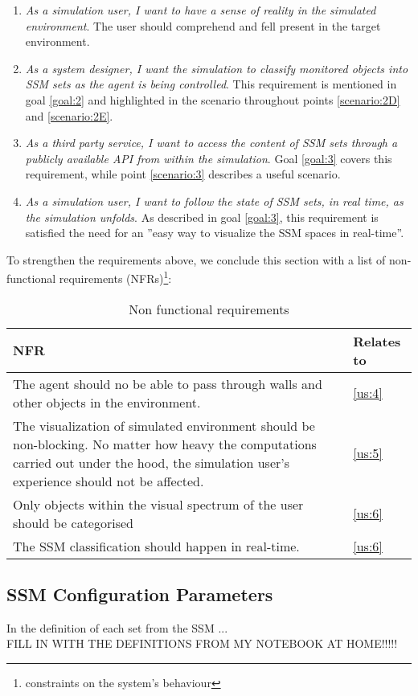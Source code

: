 \begin{enumerate}
	\item[\textlabel{5.}{us:5}] \emph{As a simulation user, I want to have a sense of reality in the simulated environment}. The user should comprehend and fell present in the target environment.

	\item[\textlabel{6.}{us:6}] \emph{As a system designer, I want the simulation to classify monitored objects into SSM sets as the agent is being controlled}. This requirement is mentioned in goal \ref{goal:2} and highlighted in the scenario throughout points \ref{scenario:2D} and \ref{scenario:2E}.

	\item[\textlabel{7.}{us:7}] \emph{As a third party service, I want to access the content of SSM sets through a publicly available API from within the simulation}. Goal \ref{goal:3} covers this requirement, while point \ref{scenario:3} describes a useful scenario.

	\item[\textlabel{8.}{us:8}] \emph{As a simulation user, I want to follow the state of SSM sets, in real time, as the simulation unfolds}. As described in goal \ref{goal:3}, this requirement is satisfied the need for an ''easy way to visualize the SSM spaces in real-time''.

\end{enumerate}

To strengthen the requirements above, we conclude this section with a list of non-functional requirements (NFRs)\footnote{constraints on the system's behaviour}:
\begin{table}[H]
	\begin{center}
		\small \begin{tabular*}{1.1\columnwidth}{p{10cm}p{1.5cm}} 
			\\ \hline \hline
			NFR & Relates to \\ \hline \hline

		 	The agent should no be able to pass through walls and other objects in the environment. & \ref{us:4}\\ \hline

		 	The visualization of simulated environment should be non-blocking. No matter how heavy the computations carried out under the hood, the simulation user's experience should not be affected. & \ref{us:5}\\ \hline

		 	Only objects within the visual spectrum of the user should be categorised & \ref{us:6}\\ \hline

		 	The SSM classification should happen in real-time. & \ref{us:6}\\ \hline

		\end{tabular*}
		
		\caption{Non functional requirements}
		\label{table:nfr}
	\end{center}
\end{table}

\subsection{SSM Configuration Parameters}\label{subsec:ssm_params}
In the definition of each set from the SSM \cite{pederson2011situative}...\\

FILL IN WITH THE DEFINITIONS FROM MY NOTEBOOK AT HOME!!!!!
